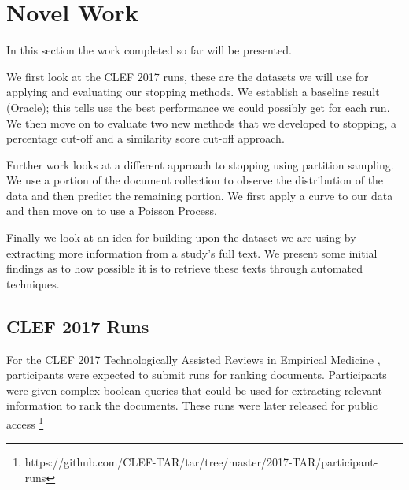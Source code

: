 \chapter{Novel Work} \label{novelw}

In this section the work completed so far will be presented. 

We first look at the CLEF 2017 runs, these are the datasets we will use for applying and evaluating our stopping methods. We establish a baseline result (Oracle); this tells use the best performance we could possibly get for each run. We then move on to evaluate two new methods that we developed to stopping, a percentage cut-off and a similarity score cut-off approach.

Further work looks at a different approach to stopping using partition sampling. We use a portion of the document collection to observe the distribution of the data and then predict the remaining portion. We first apply a curve to our data and then move on to use a Poisson Process.

Finally we look at an idea for building upon the dataset we are using by extracting more information from a study's full text. We present some initial findings as to how possible it is to retrieve these texts through automated techniques.



\section{CLEF 2017 Runs} \label{clefRuns}

For the CLEF 2017 Technologically Assisted Reviews in Empirical Medicine \cite{Kanoulas12017}, participants were expected to submit runs for ranking documents. Participants were given complex boolean queries that could be used for extracting relevant information to rank the documents. These runs were later released for public access \footnote{https://github.com/CLEF-TAR/tar/tree/master/2017-TAR/participant-runs}

